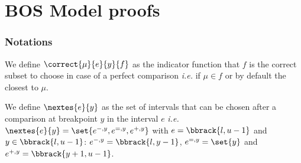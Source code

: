\section{BOS Model proofs}
\label{appendix:bos_proofs}

\subsubsection{Notations}

\begin{definition}
    We define $\correct{\mu}{e}{y}{f}$ as the indicator function that $f$ is the correct subset to choose in case of a perfect comparison \textit{i.e.} if $\mu \in f$ or by default the closest to $\mu$.
\end{definition}

\begin{definition}
    We define $\nextes{e}{y}$ as the set of intervals that can be chosen after a comparison at breakpoint $y$ in the interval $e$ \textit{i.e.} $\nextes{e}{y} = \set{e^{-,y}, e^{=,y}, e^{+,y}}$ with $e = \bbrack{l, u - 1}$ and $y \in \bbrack{l, u - 1}$: $e^{-,y} = \bbrack{l, y - 1}$, $e^{=,y} = \set{y}$ and $e^{+,y} = \bbrack{y + 1, u - 1}$.
\end{definition}

